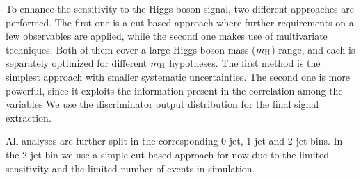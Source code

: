 To enhance the sensitivity to the Higgs boson signal, two different approaches 
are performed. The first one is a cut-based approach where further requirements 
on a few observables are applied, while the second one makes use of
multivariate techniques. Both of them cover a large Higgs boson mass
($m_{\rm{H}}$) range, and each is separately optimized for different
$m_{\rm{H}}$ hypotheses. The first method is the simplest approach with smaller
systematic uncertainties. The second one is
more powerful, since it exploits the information present in the
correlation among the variables We use the discriminator
output distribution for the final signal extraction.

All analyses are further split in the corresponding 0-jet, 1-jet and
2-jet bins. In the 2-jet bin we use a simple cut-based approach for
now due to the limited sensitivity and the limited number of events in
simulation.
